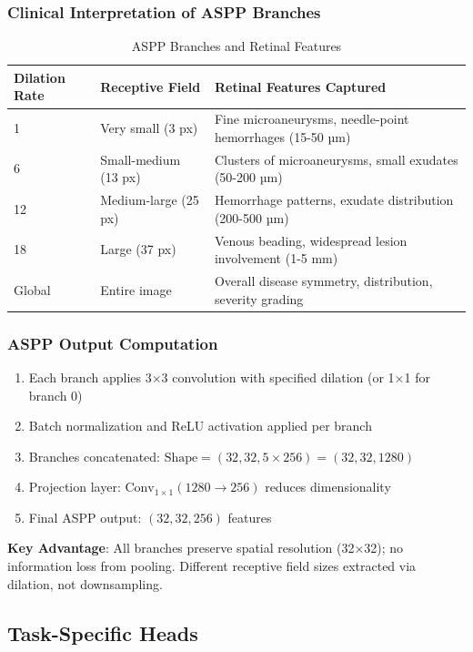 \documentclass[12pt,a4paper]{article}
\begin{document}
\subsubsection{Clinical Interpretation of ASPP Branches}

\begin{table}[H]
\centering
\small
\caption{ASPP Branches and Retinal Features}
\begin{tabular}{|p{1.5cm}|p{2cm}|p{3.5cm}|}
\hline
\textbf{Dilation Rate} & \textbf{Receptive Field} & \textbf{Retinal Features Captured} \\
\hline
1 & Very small (3 px) & Fine microaneurysms, needle-point hemorrhages (15-50 µm) \\
6 & Small-medium (13 px) & Clusters of microaneurysms, small exudates (50-200 µm) \\
12 & Medium-large (25 px) & Hemorrhage patterns, exudate distribution (200-500 µm) \\
18 & Large (37 px) & Venous beading, widespread lesion involvement (1-5 mm) \\
Global & Entire image & Overall disease symmetry, distribution, severity grading \\
\hline
\end{tabular}
\end{table}

\subsubsection{ASPP Output Computation}

\begin{enumerate}
    \item Each branch applies 3×3 convolution with specified dilation (or 1×1 for branch 0)
    \item Batch normalization and ReLU activation applied per branch
    \item Branches concatenated: $\text{Shape} = (32, 32, 5 \times 256) = (32, 32, 1280)$
    \item Projection layer: $\text{Conv}_{1×1}(1280 \rightarrow 256)$ reduces dimensionality
    \item Final ASPP output: $(32, 32, 256)$ features
\end{enumerate}

\textbf{Key Advantage}: All branches preserve spatial resolution (32×32); no information loss from pooling. Different receptive field sizes extracted via dilation, not downsampling.

\subsection{Task-Specific Heads}
\end{document}
